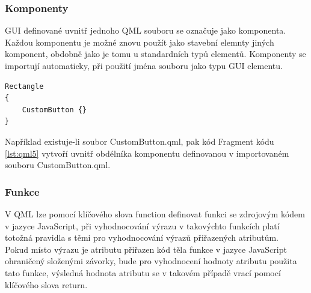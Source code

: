 \documentclass[report,11pt]{elsarticle}
\begin{document}
\subsubsection{Komponenty}
GUI definované uvnitř jednoho QML souboru se označuje jako komponenta. Každou komponentu je možné znovu použít jako stavební elemnty jiných komponent, obdobně jako je tomu u standardních typů elementů. Komponenty se importují automaticky, při použití jména souboru jako typu GUI elementu.

\begin{lstlisting}[frame=single,caption=Ukázka použití komponenty z jiného souboru.,label=lst:qml5]
Rectangle
{
	CustomButton {}
}
\end{lstlisting}
Například existuje-li soubor CustomButton.qml, pak kód Fragment kódu \ref{lst:qml5} vytvoří uvnitř obdélníka komponentu definovanou v importovaném souboru CustomButton.qml.

\subsubsection{Funkce}

V QML lze pomocí klíčového slova function definovat funkci se zdrojovým kódem v jazyce JavaScript, při vyhodnocování výrazu v takovýchto funkcích platí totožná pravidla s těmi pro vyhodnocování výrazů přiřazených atributům.\\
Pokud místo výrazu je atributu přiřazen kód těla funkce v jazyce JavaScript ohraničený složenými závorky, bude pro vyhodnocení hodnoty atributu použita tato funkce, výsledná hodnota atributu se v takovém případě vrací pomocí klíčového slova return.
\end{document}
